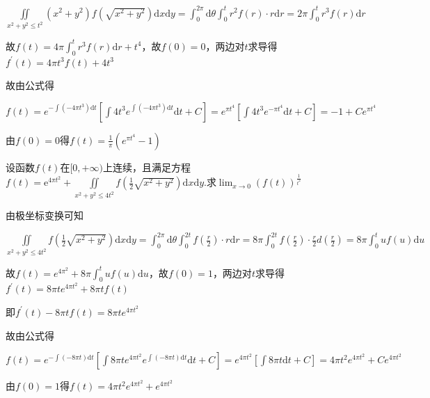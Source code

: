 \begin{xiti}
\begin{solution}
		$\iint\limits_{x^{2}+y^{2} \leq t^{2}}\left(x^{2}+y^{2}\right) f\left(\sqrt{x^{2}+y^{2}}\right) \mathrm{d}x \mathrm{d}y=\int_{0}^{2 \pi} \mathrm{d}\theta \int_{0}^{t} r^{2} f(r) \cdot r \mathrm{d}r=2 \pi \int_{0}^{t} r^{3} f(r) \mathrm{d}r$
		
		故$f(t)=4 \pi \int_{0}^{t} r^{3} f(r) \mathrm{d} r+t^{4}$，故$f(0)=0$，两边对$t$求导得$f^{\prime}(t)=4 \pi t^{3} f(t)+4 t^{3}$
		
		故由公式得
		
		$f(t)=e^{-\int\left(-4 \pi t^{3}\right) \mathrm{d} t}\left[\int 4 t^{3} e^{\int\left(-4 \pi t^{3}\right) \mathrm{d} t} \mathrm{d} t+C\right]=e^{\pi t^{4}}\left[\int 4 t^{3} e^{-\pi t^{4}} \mathrm{d} t+C\right]=-1+C e^{\pi t^{4}}$
		
		由$f(0)=0$得$f(t)=\frac{1}{\pi}\left(e^{\pi t^{4}}-1\right)$
	\end{solution}
	\item 	设函数$f(t)$在$[0,+\infty)$上连续，且满足方程$f\left(t\right)=\textrm{e}^{4\pi t^2}+\iint\limits_{x^2+y^2\leq 4t^2}{f\left(\frac{1}{2}\sqrt{x^2+y^2}\right)\textrm{d}x\textrm{d}y}$.求$\lim _{x \rightarrow 0}(f(t))^{\frac{1}{t^{2}}}$
	\begin{solution}
		由极坐标变换可知
		
		$\iint\limits_{x^{2}+y^{2} \leq 4 t^{2}} f\left(\frac{1}{2} \sqrt{x^{2}+y^{2}}\right) \mathrm{d}x \mathrm{d}y=\int_{0}^{2 \pi} \mathrm{d}\theta \int_{0}^{2 t} f\left(\frac{r}{2}\right) \cdot r \mathrm{d}r=8 \pi \int_{0}^{2 t} f\left(\frac{r}{2}\right) \cdot \frac{r}{2} d\left(\frac{r}{2}\right)=8 \pi \int_{0}^{t} u f(u) \mathrm{d}u$
		
		故$f(t)=e^{4 \pi^{2}}+8 \pi \int_{0}^{t} u f(u) \mathrm{d}u$，故$f(0)=1$，两边对$t$求导得$f^{\prime}(t)=8 \pi t e^{4 \pi t^{2}}+8 \pi t f(t)$
		
		即$f^{\prime}(t)-8 \pi t f(t)=8 \pi t e^{4 \pi t^{2}}$
		
		故由公式得
		
		$f(t)=e^{-\int(-8 \pi t) \mathrm{d}t}\left[\int 8 \pi t e^{4 \pi t^{2}} e^{\int(-8 \pi t) \mathrm{d}t} \mathrm{d}t+C\right]=e^{4 \pi t^{2}}\left[\int 8 \pi t \mathrm{d}t+C\right]=4 \pi t^{2} e^{4 \pi t^{2}}+C e^{4 \pi t^{2}}$
		
		由$f(0)=1$得$f(t)=4 \pi t^{2} e^{4 \pi t^{2}}+e^{4 \pi t^{2}}$
		

\end{solution}
\end{xiti}
